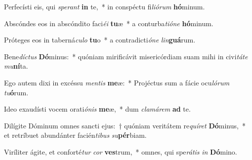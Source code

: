 \item Perfecísti eis, qui \textit{spe}\textit{rant} \textbf{in} te,~* in conspéctu fi\textit{li}\textit{ó}\textit{rum} \textbf{hó}minum.
\item Abscóndes eos in abscóndito faci\textit{é}\textit{i} \textbf{tu}æ~* a conturba\textit{ti}\textit{ó}\textit{ne} \textbf{hó}minum.
\item Próteges eos in taberná\textit{cu}\textit{lo} \textbf{tu}o~* a contradicti\textit{ó}\textit{ne} \textit{lin}\textbf{guá}rum.
\item Bene\textit{díc}\textit{tus} \textbf{Dó}minus:~* quóniam mirificávit misericórdiam suam mihi in civi\textit{tá}\textit{te} \textit{mu}\textbf{ní}ta.
\item Ego autem dixi in excéssu \textit{men}\textit{tis} \textbf{me}æ:~* Projéctus sum a fácie ocu\textit{ló}\textit{rum} \textit{tu}\textbf{ó}rum.
\item Ideo exaudísti vocem orati\textit{ó}\textit{nis} \textbf{me}æ,~* dum \textit{cla}\textit{má}\textit{rem} \textbf{ad} te.
\item Dilígite Dóminum omnes sancti ejus:~† quóniam veritátem re\textit{quí}\textit{ret} \textbf{Dó}minus,~* et retríbuet abundánter facién\textit{ti}\textit{bus} \textit{su}\textbf{pér}biam.
\item Viríliter ágite, et conforté\textit{tur} \textit{cor} \textbf{ves}trum,~* omnes, qui spe\textit{rá}\textit{tis} \textit{in} \textbf{Dó}mino.
